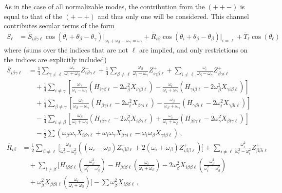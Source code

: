 \documentclass[letterpaper,11pt]{article}
\newcommand{\oi}{\omega_i}
\newcommand{\ol}{\omega_\ell}
\newcommand{\obet}{\omega_{\beta}}
\newcommand{\ogam}{\omega_\gamma}
\begin{document}
As in the case of all normalizable modes, the contribution from the $(++-)$ is equal to that of the $(+-+)$ and thus only one will be considered. This channel contributes secular terms of the form
\begin{align}
S_\ell &= \overline{S}_{i \beta \gamma \ell} \cos \left( \theta_i + \theta_\beta - \theta_\gamma \right) \Big|_{\oi + \obet - \ogam = \ol} + \overline{R}_{i \beta} \cos \left(\theta_i + \theta_\beta - \theta_\beta \right) \Big|_{i = \ell} + \overline{T}_\ell \cos \left( \theta_\ell \right)
\end{align}
where (sums over the indices that are not $\ell$ are implied, and only restrictions on the indices are explicitly included)
\begin{align}
\overline{S}_{i \beta \gamma \ell} &= \frac{1}{4} \sum_{\gamma \neq \ell} \frac{\ogam}{\oi + \obet} Z^{-}_{i \beta \gamma \ell} + \frac{1}{4} \sum_{\beta \neq \ell} \frac{\obet}{\oi - \ogam} Z^+_{i \gamma \beta \ell} + \sum_{i \neq \ell} \frac{\oi}{\obet - \ogam} Z^+_{\beta \gamma i \ell} \nonumber \\
%
& \quad + \frac{1}{4} \sum_{i \neq \gamma} \left[ \frac{\omega_\gamma}{\oi - \ogam} (H_{i \gamma \beta \ell} - 2\obet^2 X_{i \gamma \beta \ell}) - \frac{\oi}{\oi + \ogam} (H_{\gamma i \beta \ell} - 2\obet^2 X_{\gamma i \beta \ell} ) \right] \nonumber \\
%
& \quad + \frac{1}{4} \sum_{\beta \neq \gamma} \left[ \frac{\ogam}{\obet - \ogam} (H_{\beta \gamma i \ell} - 2 \oi^2 X_{\beta\gamma i \ell} ) - \frac{\obet}{\obet + \ogam} (H_{\gamma \beta i \ell} - 2\oi^2 X_{\gamma \beta i \ell} ) \right] \nonumber \\
%
& \quad -  \frac{1}{4} \sum_{i \neq \beta} \left[ \frac{\obet}{\oi + \obet} (H_{i \beta \gamma \ell} - 2\ogam^2 X_{i \beta \gamma \ell} ) + \frac{\oi}{\oi + \obet} (H_{\beta i \gamma \ell} - 2\ogam^2 X_{\beta i \gamma \ell}) \right] \nonumber \\
%
& \quad - \frac{1}{2} \sum \left( \obet \ogam X_{i \beta \gamma \ell} + \oi \ogam X_{\beta \gamma i \ell} - \oi \obet X_{\gamma i \beta \ell} \right) \, ,
\end{align}
\begin{align}
\overline{R}_{i \beta} &= \frac{1}{2} \sum_{\beta \neq \ell} \Big[ \frac{\obet}{\ol^2 - \obet^2} \left( (\oi - \obet) Z^{-}_{i \beta \beta \ell} + 2 (\oi + \obet) Z^+_{i\beta \beta \ell} \right) \Big] + \sum_{i \neq \ell} \frac{\oi^2}{\ol^2 - \oi^2} Z^+_{\beta \beta i \ell} \nonumber \\
%
& \quad + \sum_{i \neq \beta} \Big[  H_{i \beta \beta \ell} \left( \frac{\obet^2}{\oi^2 - \obet^2} \right) - H_{\beta i \beta \ell} \left( \frac{\oi}{\oi + \obet} \right) - 2\obet^2 X_{i \beta \beta \ell} \left( \frac{\obet^2}{\oi^2 - \obet^2} \right) \nonumber \\
%
& \quad + \obet^2 X_{\beta \beta i \ell} \left( \frac{\oi}{\oi + \obet} \right) \Big] - \sum \obet^2 X_{i\beta\beta \ell} \, ,
\end{align}
\end{document}
